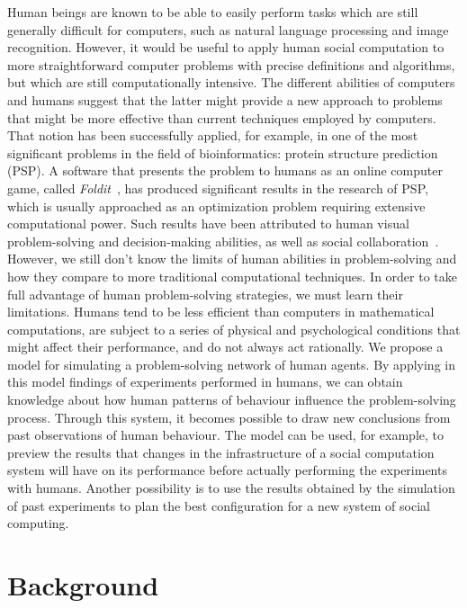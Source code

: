 \documentclass{article}
\begin{document}
Human beings are known to be able to easily perform tasks which are still generally difficult for computers, such as natural language processing and image recognition.
However, it would be useful to apply human social computation to more straightforward computer problems with precise definitions and algorithms, but which are still computationally intensive.
The different abilities of computers and humans suggest that the latter might provide a new approach to problems that might be more effective than current techniques employed by computers. That notion has been successfully applied, for example, in one of the most significant problems in the field of bioinformatics: protein structure prediction (PSP). A software that presents the problem to humans as an online computer game, called \emph{Foldit}~\cite{cooper:foldit}, has produced significant results in the research of PSP, which is usually approached as an optimization problem requiring extensive computational power. Such results have been attributed to human visual problem-solving and decision-making abilities, as well as social collaboration~\cite{cooper:foldit}. However, we still don't know the limits of human abilities in problem-solving and how they compare to more traditional computational techniques.
In order to take full advantage of human problem-solving strategies, we must learn their limitations. Humans tend to be less efficient than computers in mathematical computations, are subject to a series of physical and psychological conditions that might affect their performance, and do not always act rationally.
We propose a model for simulating a problem-solving network of human agents. By applying in this model findings of experiments performed in humans, we can obtain knowledge about how human patterns of behaviour influence the problem-solving process. Through this system, it becomes possible to draw new conclusions from past observations of human behaviour. The model can be used, for example, to preview the results that changes in the infrastructure of a social computation system will have on its performance before actually performing the experiments with humans. Another possibility is to use the results obtained by the simulation of past experiments to plan the best configuration for a new system of social computing.

\section{Background}
\end{document}
